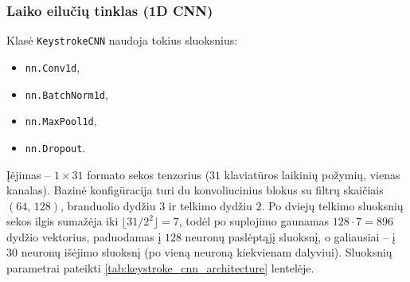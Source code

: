 \subsubsection{Laiko eilučių tinklas (1D CNN)}
\label{subsubsec:keystroke_cnn}

Klasė \texttt{KeystrokeCNN} naudoja tokius sluoksnius:
\begin{itemize}
    \item \texttt{nn.Conv1d},
    \item \texttt{nn.BatchNorm1d},
    \item \texttt{nn.MaxPool1d},
    \item \texttt{nn.Dropout}.
\end{itemize}
 Įėjimas – $1 \times 31$ formato sekos tenzorius ($31$ klaviatūros laikinių požymių, vienas kanalas). Bazinė konfigūracija turi du konvoliucinius blokus su filtrų skaičiais $(64,\,128)$, branduolio dydžiu $3$ ir telkimo dydžiu $2$. Po dviejų telkimo sluoksnių sekos ilgis sumažėja iki $\lfloor 31 / 2^{2} \rfloor = 7$, todėl po suplojimo gaunamas $128 \cdot 7 = 896$ dydžio vektorius, paduodamas į $128$ neuronų paslėptąjį sluoksnį, o galiausiai – į $30$ neuronų išėjimo sluoksnį (po vieną neuroną kiekvienam dalyviui). Sluoksnių parametrai pateikti \ref{tab:keystroke_cnn_architecture} lentelėje.


